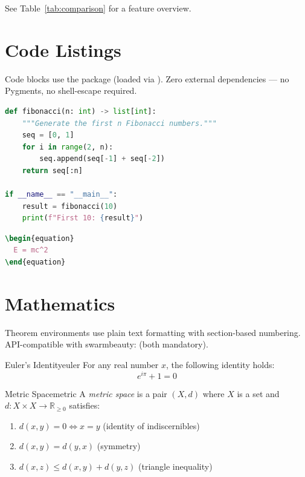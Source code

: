 \documentclass[11pt, a4paper]{article}
\begin{document}
See Table~\ref{tab:comparison} for a feature overview.


\section{Code Listings}

Code blocks use the  package (loaded via
). Zero external dependencies --- no Pygments,
no shell-escape required.

\begin{lstlisting}[language=Python,
  title={\sffamily\small Fibonacci sequence generator}]
def fibonacci(n: int) -> list[int]:
    """Generate the first n Fibonacci numbers."""
    seq = [0, 1]
    for i in range(2, n):
        seq.append(seq[-1] + seq[-2])
    return seq[:n]

if __name__ == "__main__":
    result = fibonacci(10)
    print(f"First 10: {result}")
\end{lstlisting}

\begin{lstlisting}[language=TeX]
\begin{equation}
  E = mc^2
\end{equation}
\end{lstlisting}


\section{Mathematics}

Theorem environments use plain text formatting with section-based numbering.
API-compatible with swarmbeauty:  (both mandatory).

\begin{theorem}{Euler's Identity}{euler}
  For any real number $x$, the following identity holds:
  \[
    e^{i\pi} + 1 = 0
  \]
\end{theorem}

\begin{definition}{Metric Space}{metric}
  A \emph{metric space} is a pair $(X, d)$ where $X$ is a set and
  $d\colon X \times X \to \mathbb{R}_{\geq 0}$ satisfies:
  \begin{enumerate}[itemsep=2pt]
    \item $d(x, y) = 0 \iff x = y$ \quad (identity of indiscernibles)
    \item $d(x, y) = d(y, x)$ \quad (symmetry)
    \item $d(x, z) \leq d(x, y) + d(y, z)$ \quad (triangle inequality)
  \end{enumerate}
\end{definition}
\end{document}
